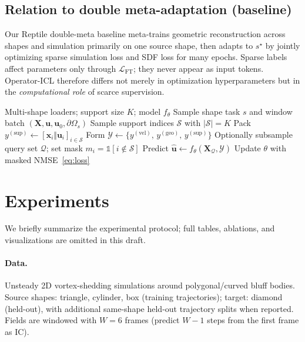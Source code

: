 \documentclass[11pt,a4paper]{article}
\begin{document}
\subsection{Relation to double meta-adaptation (baseline)}
\label{sec:baseline}

Our Reptile double-meta baseline meta-trains geometric reconstruction across shapes and simulation primarily on one source shape, then adapts to $s^{\star}$ by jointly optimizing sparse simulation loss and SDF loss for many epochs.
Sparse labels affect parameters only through $\mathcal{L}_{\mathrm{FT}}$; they never appear as input tokens.
Operator-ICL therefore differs not merely in optimization hyperparameters but in the \emph{computational role} of scarce supervision.

\begin{algorithm}[t]
\caption{Operator-ICL meta-training (one episode)}
\label{alg:episode}
\begin{algorithmic}[1]
\Require Multi-shape loaders; support size $K$; model $f_{\theta}$
\State Sample shape task $s$ and window batch $(\mathbf{X},\mathbf{u},\mathbf{u}_{0},\partial\Omega_{s})$
\State Sample support indices $\mathcal{S}$ with $|\mathcal{S}|=K$
\State Pack $y^{(\mathrm{sup})}\leftarrow[\mathbf{x}_i\Vert\mathbf{u}_i]_{i\in\mathcal{S}}$
\State Form $\mathcal{Y}\leftarrow\{y^{(\mathrm{vel})},\,y^{(\mathrm{geo})},\,y^{(\mathrm{sup})}\}$
\State Optionally subsample query set $\mathcal{Q}$; set mask $m_i=\mathbb{1}[i\notin\mathcal{S}]$
\State Predict $\hat{\mathbf{u}}\leftarrow f_{\theta}(\mathbf{X}_{\mathcal{Q}},\mathcal{Y})$
\State Update $\theta$ with masked NMSE~\eqref{eq:loss}
\end{algorithmic}
\end{algorithm}

\section{Experiments}
\label{sec:exp}

We briefly summarize the experimental protocol; full tables, ablations, and visualizations are omitted in this draft.

\paragraph{Data.}
Unsteady 2D vortex-shedding simulations around polygonal/curved bluff bodies.
Source shapes: triangle, cylinder, box (training trajectories); target: diamond (held-out), with additional same-shape held-out trajectory splits when reported.
Fields are windowed with $W{=}6$ frames (predict $W{-}1$ steps from the first frame as IC).
\end{document}
